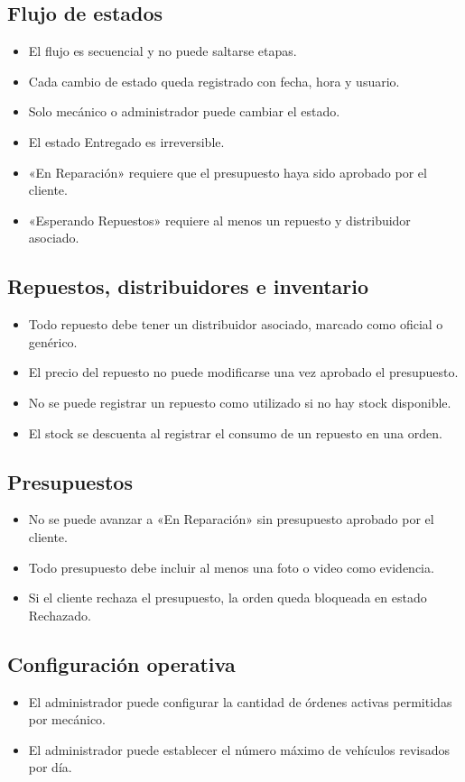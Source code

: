 \documentclass[11pt]{article}
\begin{document}
\subsection{Flujo de estados}
\begin{itemize}
  \item El flujo es secuencial y no puede saltarse etapas.
  \item Cada cambio de estado queda registrado con fecha, hora y usuario.
  \item Solo mecánico o administrador puede cambiar el estado.
  \item El estado Entregado es irreversible.
  \item «En Reparación» requiere que el presupuesto haya sido aprobado por el cliente.
  \item «Esperando Repuestos» requiere al menos un repuesto y distribuidor asociado.
\end{itemize}

\subsection{Repuestos, distribuidores e inventario}
\begin{itemize}
  \item Todo repuesto debe tener un distribuidor asociado, marcado como oficial o genérico.
  \item El precio del repuesto no puede modificarse una vez aprobado el presupuesto.
  \item No se puede registrar un repuesto como utilizado si no hay stock disponible.
  \item El stock se descuenta al registrar el consumo de un repuesto en una orden.
\end{itemize}

\subsection{Presupuestos}
\begin{itemize}
  \item No se puede avanzar a «En Reparación» sin presupuesto aprobado por el cliente.
  \item Todo presupuesto debe incluir al menos una foto o video como evidencia.
  \item Si el cliente rechaza el presupuesto, la orden queda bloqueada en estado Rechazado.
\end{itemize}

\subsection{Configuración operativa}
\begin{itemize}
  \item El administrador puede configurar la cantidad de órdenes activas permitidas por mecánico.
  \item El administrador puede establecer el número máximo de vehículos revisados por día.
\end{itemize}
\end{document}
